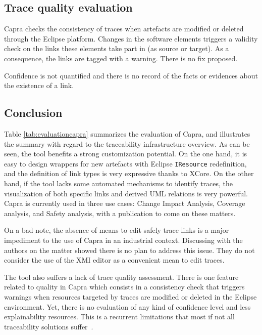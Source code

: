 \subsection{Trace quality evaluation}
Capra checks the consistency of traces when artefacts are modified or deleted through the Eclipse platform. Changes in the software elements triggers a validity check on the links these elements take part in (as source or target). As a consequence, the links are tagged with a warning. There is no fix proposed.

Confidence is not quantified and there is no record of the facts or evidences about the existence of a link.

\subsection{Conclusion}

Table \ref{tab:evaluationcapra} summarizes the evaluation of Capra, and  illustrates the summary with regard to the traceability infrastructure overview. As can be seen, the tool benefits a strong customization potential. On the one hand, it is easy to design wrappers for new artefacts with Eclipse \texttt{IResource} redefinition, and the definition of link types is very expressive thanks to XCore.   
On the other hand, if the tool lacks some automated mechanisms to identify traces, the visualization of both specific links and derived UML relations is very powerful. 
Capra is currently used in three use cases: Change Impact Analysis, Coverage analysis, and Safety analysis, with a publication to come on these matters. 

On a bad note, the absence of means to edit safely trace links is a major impediment to the use of Capra in an industrial context. Discussing with the authors on the matter showed there is no plan to address this issue. They do not consider the use of the XMI editor as a convenient mean to edit traces.

The tool also suffers a lack of trace quality assessment. 
There is one feature related to quality in Capra which consists in a consistency check that triggers warnings when resources targeted by traces are modified or deleted in the Eclipse environment.
Yet, there is no evaluation of any kind of confidence level and less explainability resources. This is a recurrent limitations that most if not all traceability solutions suffer~\cite{batot2020-survey-driven-feature-model,batot2021-not-another-metamodel}. 


